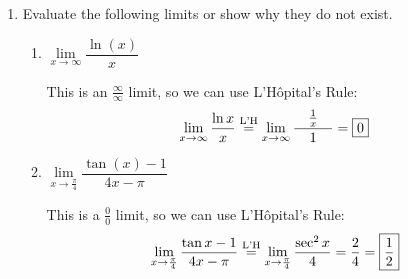 \documentclass{article}
\begin{document}
\begin{enumerate}
\begin{enumerate}
\begin{solution}
            Since the two one-sided limits aren't equal, $\lim_{x\to 1}\dfrac{e^x}{\ln x}$ \textbf{does not exist}.
        \end{solution}
        \probonly{\vfill\vfill}
        
    \end{enumerate}

\probonly{\newpage}

  \begin{framed}
    \textbf{L'Hôpital's Rule.} \\ 
    If $\displaystyle \lim_{x \to a}
    \frac{f(x)}{g(x)}$ is a
     or
    type of limit, then $\displaystyle \lim_{x
      \to a} \frac{f(x)}{g(x)} =$
    , if the latter limit exists or is $\pm
    \infty$.\\

    Limits of the form ``$0\cdot \infty$'' and ``$1^\infty$'' can be rewritten to apply L'Hôpital's Rule.
  \end{framed}

\item Evaluate the following limits or show why they do not exist.
\begin{enumerate}
    
    \item $\lim\limits_{x \to \infty} \dfrac{\ln(x)}{x}$
        
        \begin{solution}
        This is an $\frac{\infty}{\infty}$ limit, so we can use
        L'H\^opital's Rule: 
        \[\displaystyle \lim_{x\to\infty} \frac{\ln
          x}{x} \stackrel{\text{L'H}}{=} \lim_{x\to\infty} \frac{\quad \frac{1}{x} \quad}{1}
        = \boxed{0}\]
      \end{solution}
      \probonly{\vfill}
      
      \item $\lim\limits_{x \to \frac{\pi}{4}} \dfrac{\tan(x)-1}{4x - \pi}$
        
      \begin{solution}
        This is a $ \frac{0}{0}$ limit, so we can use L'H\^opital's Rule:
        \[\displaystyle \lim_{x\to\frac{\pi}{4}}\frac{\tan x - 1}{4x - \pi}
        \stackrel{\text{L'H}}{=} \lim_{x\to\frac{\pi}{4}} \frac{\sec^2 x}{4} = \frac{2}{4} =
        \boxed{\frac{1}{2}}\]
      \end{solution}
      \probonly{\vfill}
        

\end{enumerate}
\end{enumerate}
\end{document}
